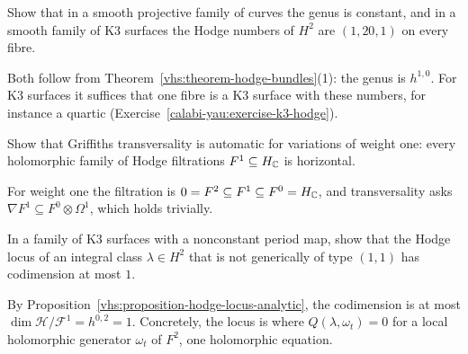 \begin{exercise}\label{vhs:exercise-constant-hodge-numbers}
Show that in a smooth projective family of curves the genus is constant, and in a smooth family of K3 surfaces the Hodge numbers of $H^2$ are $(1, 20, 1)$ on every fibre.
\end{exercise}

\begin{solution}
Both follow from Theorem~\ref{vhs:theorem-hodge-bundles}(1): the genus is $h^{1,0}$. For K3 surfaces it suffices that one fibre is a K3 surface with these numbers, for instance a quartic
(Exercise~\ref{calabi-yau:exercise-k3-hodge}).
\end{solution}

\begin{exercise}\label{vhs:exercise-transversality-weight-one}
Show that Griffiths transversality is automatic for variations of weight one: every holomorphic family of Hodge filtrations $F^1 \subseteq H_{\mathbb{C}}$ is horizontal.
\end{exercise}

\begin{solution}
For weight one the filtration is $0 = F^2 \subseteq F^1 \subseteq F^0 = H_{\mathbb{C}}$, and transversality asks $\nabla F^1 \subseteq F^0 \otimes \Omega^1$, which holds trivially.
\end{solution}

\begin{exercise}\label{vhs:exercise-hodge-locus-codimension}
In a family of K3 surfaces with a nonconstant period map, show that the Hodge locus of an integral class $\lambda \in H^2$ that is not generically of type $(1,1)$ has codimension at most $1$.
\end{exercise}

\begin{solution}
By Proposition~\ref{vhs:proposition-hodge-locus-analytic}, the codimension is at most $\dim\mathcal{H}/\mathcal{F}^1 = h^{0,2} = 1$. Concretely, the locus is where $Q(\lambda, \omega_t) = 0$ for a local
holomorphic generator $\omega_t$ of $F^2$, one holomorphic equation.
\end{solution}
